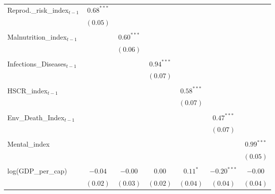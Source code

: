 \begin{table}
\begin{center}
\begin{tabular}{l c c c c c c}
Reprod.\_risk\_index$_{t-1}$    & $0.68^{***}$ &               &              &              &               &              \\
                                     & $(0.05)$     &               &              &              &               &              \\  
& & & & & & \\
Malnutrition\_index$_{t-1}$   &              & $0.60^{***}$  &              &              &               &              \\
                                     &              & $(0.06)$      &              &              &               &              \\
& & & & & & \\
Infections\_Diseases$_{t-1}$   &              &               & $0.94^{***}$ &              &               &              \\
                                     &              &               & $(0.07)$     &              &               &              \\
& & & & & & \\
HSCR\_index$_{t-1}$     &              &               &              & $0.58^{***}$ &               &              \\
                                     &              &               &              & $(0.07)$     &               &              \\
& & & & & & \\
Env\_Death\_Index$_{t-1}$ &              &               &              &              & $0.47^{***}$  &              \\
                                     &              &               &              &              & $(0.07)$      &              \\
& & & & & & \\
Mental\_index   &              &               &              &              &               & $0.99^{***}$ \\
                                     &              &               &              &              &               & $(0.05)$     \\
& & & & & & \\
log(GDP\_per\_cap)                   & $-0.04$      & $-0.00$       & $0.00$       & $0.11^{*}$   & $-0.20^{***}$ & $-0.00$      \\
                                     & $(0.02)$     & $(0.03)$      & $(0.02)$     & $(0.04)$     & $(0.04)$      & $(0.04)$     \\

\end{tabular}
\end{center}
\end{table}
